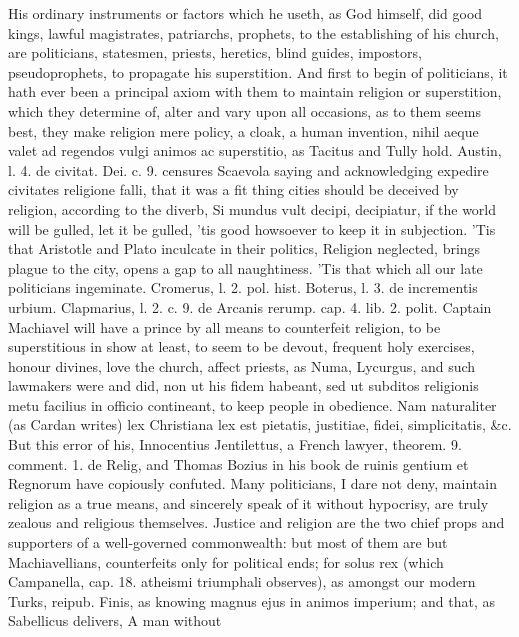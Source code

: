 {His ordinary instruments or factors which he useth, as God himself, did
good kings, lawful magistrates, patriarchs, prophets, to the
establishing of his church, are politicians, statesmen, priests,
heretics, blind guides, impostors, pseudoprophets, to propagate his
superstition. And first to begin of politicians, it hath ever been a
principal axiom with them to maintain religion or superstition, which
they determine of, alter and vary upon all occasions, as to them seems
best, they make religion mere policy, a cloak, a human invention, nihil
aeque valet ad regendos vulgi animos ac superstitio, as Tacitus
and Tully hold. Austin, l. 4. de civitat. Dei. c. 9. censures
Scaevola saying and acknowledging expedire civitates religione falli,
that it was a fit thing cities should be deceived by religion,
according to the diverb, Si mundus vult decipi, decipiatur, if the
world will be gulled, let it be gulled, 'tis good howsoever to keep it
in subjection. 'Tis that Aristotle and Plato inculcate in
their politics, Religion neglected, brings plague to the city, opens a
gap to all naughtiness. 'Tis that which all our late politicians
ingeminate. Cromerus, l. 2. pol. hist. Boterus, l. 3. de incrementis
urbium. Clapmarius, l. 2. c. 9. de Arcanis rerump. cap. 4. lib. 2.
polit. Captain Machiavel will have a prince by all means to counterfeit
religion, to be superstitious in show at least, to seem to be devout,
frequent holy exercises, honour divines, love the church, affect
priests, as Numa, Lycurgus, and such lawmakers were and did, non ut his
fidem habeant, sed ut subditos religionis metu facilius in officio
contineant, to keep people in obedience. Nam naturaliter (as
Cardan writes) lex Christiana lex est pietatis, justitiae, fidei,
simplicitatis, \&c. But this error of his, Innocentius Jentilettus, a
French lawyer, theorem. 9. comment. 1. de Relig, and Thomas Bozius in
his book de ruinis gentium et Regnorum have copiously confuted. Many
politicians, I dare not deny, maintain religion as a true means, and
sincerely speak of it without hypocrisy, are truly zealous and
religious themselves. Justice and religion are the two chief props and
supporters of a well-governed commonwealth: but most of them are but
Machiavellians, counterfeits only for political ends; for solus rex
(which Campanella, cap. 18. atheismi triumphali observes), as amongst
our modern Turks, reipub. Finis, as knowing magnus ejus in animos
imperium; and that, as Sabellicus delivers, A man without
}
